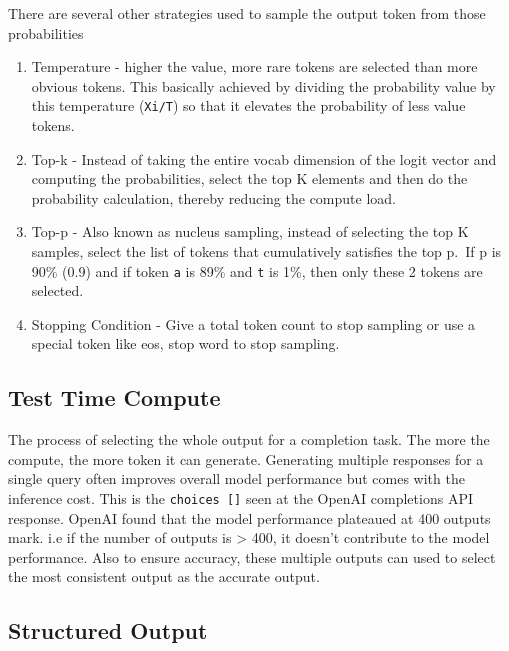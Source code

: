 \documentclass[
  letterpaper,
  DIV=11,
  numbers=noendperiod]{scrreprt}
\providecommand{\tightlist}{%
  \setlength{\itemsep}{0pt}\setlength{\parskip}{0pt}}\usepackage{longtable,booktabs,array}
\begin{document}
There are several other strategies used to sample the output token from
those probabilities

\begin{enumerate}
\def\labelenumi{\arabic{enumi})}
\tightlist
\item
  Temperature - higher the value, more rare tokens are selected than
  more obvious tokens. This basically achieved by dividing the
  probability value by this temperature (\texttt{Xi/T}) so that it
  elevates the probability of less value tokens.
\item
  Top-k - Instead of taking the entire vocab dimension of the logit
  vector and computing the probabilities, select the top K elements and
  then do the probability calculation, thereby reducing the compute
  load.
\item
  Top-p - Also known as nucleus sampling, instead of selecting the top K
  samples, select the list of tokens that cumulatively satisfies the top
  p.~If p is 90\% (0.9) and if token \texttt{a} is 89\% and \texttt{t}
  is 1\%, then only these 2 tokens are selected.
\item
  Stopping Condition - Give a total token count to stop sampling or use
  a special token like eos, stop word to stop sampling.
\end{enumerate}

\subsection*{Test Time Compute}\label{test-time-compute}

The process of selecting the whole output for a completion task. The
more the compute, the more token it can generate. Generating multiple
responses for a single query often improves overall model performance
but comes with the inference cost. This is the \texttt{choices\ {[}{]}}
seen at the OpenAI completions API response. OpenAI found that the model
performance plateaued at 400 outputs mark. i.e if the number of outputs
is \textgreater{} 400, it doesn't contribute to the model performance.
Also to ensure accuracy, these multiple outputs can used to select the
most consistent output as the accurate output.

\subsection*{Structured Output}\label{structured-output}
\end{document}
